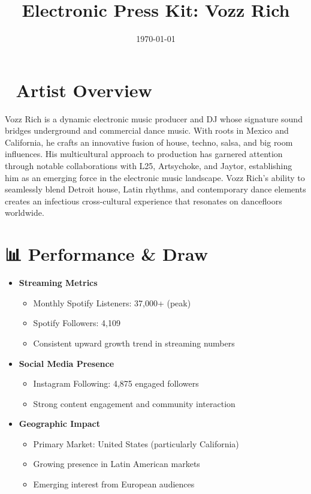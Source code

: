 \documentclass{article}
\title{Electronic Press Kit: Vozz Rich}
\date{\today}
\begin{document}
\maketitle

\section*{🎤 Artist Overview}
Vozz Rich is a dynamic electronic music producer and DJ whose signature sound bridges underground and commercial dance music. With roots in Mexico and California, he crafts an innovative fusion of house, techno, salsa, and big room influences. His multicultural approach to production has garnered attention through notable collaborations with L25, Artsychoke, and Jaytor, establishing him as an emerging force in the electronic music landscape. Vozz Rich's ability to seamlessly blend Detroit house, Latin rhythms, and contemporary dance elements creates an infectious cross-cultural experience that resonates on dancefloors worldwide.

\section*{📊 Performance \& Draw}
\begin{itemize}
\item \textbf{Streaming Metrics}
    \begin{itemize}
    \item Monthly Spotify Listeners: 37,000+ (peak)
    \item Spotify Followers: 4,109
    \item Consistent upward growth trend in streaming numbers
    \end{itemize}
\item \textbf{Social Media Presence}
    \begin{itemize}
    \item Instagram Following: 4,875 engaged followers
    \item Strong content engagement and community interaction
    \end{itemize}
\item \textbf{Geographic Impact}
    \begin{itemize}
    \item Primary Market: United States (particularly California)
    \item Growing presence in Latin American markets
    \item Emerging interest from European audiences
    \end{itemize}
\end{itemize}
\end{document}
